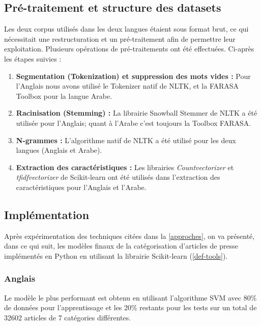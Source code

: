 \subsection{Pré-traitement et structure des datasets}
Les deux corpus utilisés dans les deux langues étaient sous format brut, ce qui nécessitait une restructuration et un pré-traitement afin de permettre leur exploitation. Plusieurs opérations de pré-traitements ont été effectuées. Ci-après les étapes suivies :

\begin{enumerate}
    \item{\textbf{Segmentation (Tokenization) et suppression des mots vides :} } Pour l'Anglais nous avons utilisé le Tokenizer natif de NLTK, et la FARASA Toolbox pour la langue Arabe.\\  
    
    \item{\textbf{Racinisation (Stemming) :} } 
    La librairie Snowball Stemmer de NLTK a été utilisée pour l'Anglais; quant à l'Arabe c'est toujours la Toolbox FARASA.\\
    
    \item{\textbf{N-grammes :} }
    L'algorithme natif de NLTK a été utilisé pour les deux langues (Anglais et Arabe).\\ 
    
    \item{\textbf{Extraction des caractéristiques :} }
    Les librairies \emph{Countvectorizer} et \emph{tfidfvectorizer} de Scikit-learn ont été utilisés dans l'extraction des caractéristiques pour l'Anglais et l'Arabe.\\
\end{enumerate}


\subsection{Implémentation}
Après expérimentation des techniques citées dans la \autoref{approches}, on va présenté, dans ce qui suit, les modèles finaux de la catégorisation d'articles de presse implémentés en Python en utilisant la librairie Scikit-learn (\autoref{def-tools}).

    \subsubsection{Anglais}
    Le modèle le plus performant est obtenu en utilisant l'algorithme SVM avec 80\% de données pour l'apprentissage et les 20\% restants pour les tests sur un total de 32602 articles de 7 catégories différentes.
    
